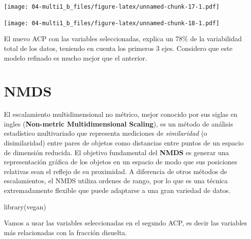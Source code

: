 \documentclass[
]{book}
\newenvironment{Shaded}{\begin{snugshade}}{\end{snugshade}}
\newcommand{\AttributeTok}[1]{\textcolor[rgb]{0.77,0.63,0.00}{#1}}
\newcommand{\ConstantTok}[1]{\textcolor[rgb]{0.00,0.00,0.00}{#1}}
\newcommand{\DecValTok}[1]{\textcolor[rgb]{0.00,0.00,0.81}{#1}}
\newcommand{\FunctionTok}[1]{\textcolor[rgb]{0.00,0.00,0.00}{#1}}
\newcommand{\NormalTok}[1]{#1}
\newcommand{\SpecialCharTok}[1]{\textcolor[rgb]{0.00,0.00,0.00}{#1}}
\newcommand{\StringTok}[1]{\textcolor[rgb]{0.31,0.60,0.02}{#1}}
\begin{document}
\texttt{[image: 04-multi1\_b\_files/figure-latex/unnamed-chunk-17-1.pdf]}

\begin{Shaded}
\end{Shaded}

\texttt{[image: 04-multi1\_b\_files/figure-latex/unnamed-chunk-18-1.pdf]}

El nuevo ACP con las variables seleccionadas, explica un 78\% de la variabilidad total de los datos, teniendo en cuenta los primeros 3 ejes. Considero que este modelo refinado es mucho mejor que el anterior.

\hypertarget{nmds}{%
\section{NMDS}\label{nmds}}

El escalamiento multidimensional no métrico, mejor conocido por sus siglas en ingles (\textbf{Non-metric Multidimensional Scaling}), es un método de análisis estadístico multivariado que representa mediciones de \emph{similaridad} (o disimilaridad) entre pares de objetos como distancias entre puntos de un espacio de dimensión reducida. El objetivo fundamental del \textbf{NMDS} es generar una representación gráfica de los objetos en un espacio de modo que sus posiciones relativas sean el reflejo de su proximidad. A diferencia de otros métodos de escalamientos, el NMDS utiliza ordenes de rango, por lo que es una técnica extremadamente flexible que puede adaptarse a una gran variedad de datos.

\begin{Shaded}
\begin{Highlighting}[]
\FunctionTok{library}\NormalTok{(vegan)}
\end{Highlighting}
\end{Shaded}

Vamos a usar las variables seleccionadas en el segundo ACP, es decir las variables más relacionadas con la fracción disuelta.
\end{document}
